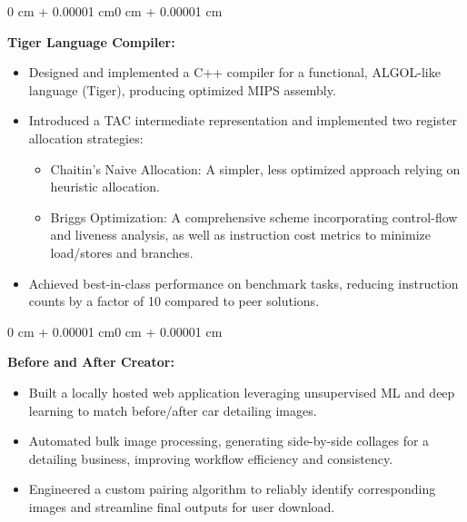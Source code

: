 \documentclass[11pt, letterpaper]{article}
\newenvironment{highlights}{
    \begin{itemize}[
        topsep=0.10 cm,
        parsep=0.10 cm,
        partopsep=0pt,
        itemsep=0pt,
        leftmargin=0.4 cm + 10pt
    ]
}{
    \end{itemize}
}
\newenvironment{onecolentry}{
    \begin{adjustwidth}{0 cm + 0.00001 cm}{0 cm + 0.00001 cm}
}{
    \end{adjustwidth}
}
\begin{document}
\vspace{0.4 cm}

\begin{onecolentry}
    \textbf{Tiger Language Compiler:}
    \begin{highlights}
        \item Designed and implemented a C++ compiler for a functional, ALGOL-like language (Tiger), producing optimized MIPS assembly.
        \item Introduced a TAC intermediate representation and implemented two register allocation strategies:
            \begin{itemize}[leftmargin=15pt]
                \item Chaitin's Naive Allocation: A simpler, less optimized approach relying on heuristic allocation.
                \item Briggs Optimization: A comprehensive scheme incorporating control-flow and liveness analysis, as well as instruction cost metrics to minimize load/stores and branches.
            \end{itemize}
        \item Achieved best-in-class performance on benchmark tasks, reducing instruction counts by a factor of 10 compared to peer solutions.
    \end{highlights}
\end{onecolentry}

\vspace{0.4 cm}

\begin{onecolentry}
    \textbf{Before and After Creator:}
    \begin{highlights}
        \item Built a locally hosted web application leveraging unsupervised ML and deep learning to match before/after car detailing images.
        \item Automated bulk image processing, generating side-by-side collages for a detailing business, improving workflow efficiency and consistency.
        \item Engineered a custom pairing algorithm to reliably identify corresponding images and streamline final outputs for user download.
    \end{highlights}
\end{onecolentry}
\end{document}

